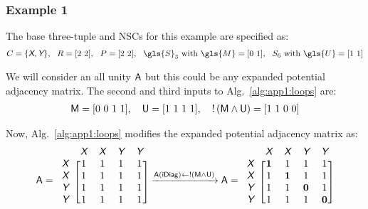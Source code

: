 \subsubsection{Example 1\label{sec:app1:loops-ex1}}

The base three-tuple and NSCs for this example are specified as:
\begin{align}
C = \{ \xcolor{X}, \xcolor{Y} \}, \ \ R = [2\ 2], \ \ P = [2\ 2], \ \ \gls{S}_3 \text{ with } \gls{M} = [0\ 1], \ \ S_6 \text{ with } \gls{U} = [1 \ 1]
\end{align}

\noindent We will consider an all unity $\textup{\textsf{A}}$ but this could be any expanded potential adjacency matrix. The second and third inputs to Alg.~\ref{alg:app1:loops} are:
\begin{align}
\textup{\textsf{M}} = [0\ 0\ 1\ 1], \quad \textup{\textsf{U}} = [1\ 1\ 1\ 1], \quad !\left(\textup{\textsf{M}} \land \textup{\textsf{U}}\right) = [1\ 1\ 0\ 0]
\end{align}

\noindent Now, Alg.~\ref{alg:app1:loops} modifies the expanded potential adjacency matrix as:
\begin{align}
\xvar{A} = \begin{blockarray}{ccccc}
& \xcolor{X} & \xcolor{X} & \xcolor{Y} & \xcolor{Y} \\
\begin{block}{c[cccc]}
\xcolor{X} & 1 & 1 & 1 & 1 \\
\xcolor{X} & 1 & 1 & 1 & 1 \\
\xcolor{Y} & 1 & 1 & 1 & 1 \\
\xcolor{Y} & 1 & 1 & 1 & 1 \\
\end{block}
\end{blockarray}
\xrightarrow{\xvar{A}(\xvar{iDiag}) \leftarrow !\left(\xvar{M} \land \xvar{U}\right)}
\xvar{A} = \begin{blockarray}{ccccc}
& \xcolor{X} & \xcolor{X} & \xcolor{Y} & \xcolor{Y} \\
\begin{block}{c[cccc]}
\xcolor{X} & \bm{1} & 1 & 1 & 1 \\
\xcolor{X} & 1 & \bm{1} & 1 & 1 \\
\xcolor{Y} & 1 & 1 & \bm{0} & 1 \\
\xcolor{Y} & 1 & 1 & 1 & \bm{0} \\
\end{block}
\end{blockarray}
\end{align}
\vspace{-2em}

